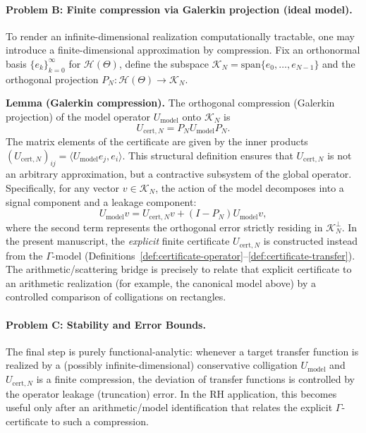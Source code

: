 \documentclass[11pt]{article}
\theoremstyle{definition}
\theoremstyle{remark}
\theoremstyle{definition}
\begin{document}
\paragraph{Problem B: Finite compression via Galerkin projection (ideal model).}
To render an infinite-dimensional realization computationally tractable, one may introduce a finite-dimensional approximation by compression. Fix an orthonormal basis $\{e_k\}_{k=0}^{\infty}$ for $\mathcal{H}(\Theta)$, define the subspace $\mathcal{K}_N = \mathrm{span}\{e_0, \dots, e_{N-1}\}$ and the orthogonal projection $P_N: \mathcal{H}(\Theta) \to \mathcal{K}_N$.

\textbf{Lemma (Galerkin compression).}
The orthogonal compression (Galerkin projection) of the model operator $U_{\mathrm{model}}$ onto $\mathcal{K}_N$ is
\[
    U_{\mathrm{cert},N} = P_N U_{\mathrm{model}} P_N.
\]
The matrix elements of the certificate are given by the inner products $(U_{\mathrm{cert},N})_{ij} = \langle U_{\mathrm{model}} e_j, e_i \rangle$. This structural definition ensures that $U_{\mathrm{cert},N}$ is not an arbitrary approximation, but a contractive subsystem of the global operator. Specifically, for any vector $v \in \mathcal{K}_N$, the action of the model decomposes into a signal component and a leakage component:
\[
    U_{\mathrm{model}} v = U_{\mathrm{cert},N} v + (I - P_N) U_{\mathrm{model}} v,
\]
where the second term represents the orthogonal error strictly residing in $\mathcal{K}_N^\perp$.
\smallskip
\noindent In the present manuscript, the \emph{explicit} finite certificate $U_{\mathrm{cert},N}$ is constructed instead from the $\Gamma$-model (Definitions~\ref{def:certificate-operator}--\ref{def:certificate-transfer}). The arithmetic/scattering bridge is precisely to relate that explicit certificate to an arithmetic realization (for example, the canonical model above) by a controlled comparison of colligations on rectangles.

\paragraph{Problem C: Stability and Error Bounds.}
The final step is purely functional-analytic: whenever a target transfer function is realized by a (possibly infinite-dimensional) conservative colligation $U_{\mathrm{model}}$ and $U_{\mathrm{cert},N}$ is a finite compression, the deviation of transfer functions is controlled by the operator leakage (truncation) error. In the RH application, this becomes useful only after an arithmetic/model identification that relates the explicit $\Gamma$-certificate to such a compression.
\end{document}
